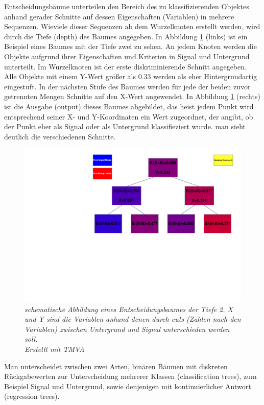 Entscheidungsb\"aume unterteilen den Bereich des zu klassifizierenden Objektes anhand gerader Schnitte auf dessen Eigenschaften (Variablen) in mehrere Sequenzen. Wieviele dieser Sequenzen ab dem Wurzelknoten erstellt werden, wird durch die Tiefe (depth) des Baumes angegeben. In Abbildung \ref{fig:DecicionTree} (links) ist ein Beispiel eines Baumes mit der Tiefe zwei zu sehen. An jedem Knoten werden die Objekte aufgrund ihrer Eigenschaften und Kriterien in Signal und Untergrund unterteilt. Im Wurzelknoten ist der erste diskriminierende Schnitt angegeben. Alle Objekte mit einem Y-Wert gr\"o\ss er als 0.33 werden als eher Hintergrundartig eingestuft. In der n\"achsten Stufe des Baumes werden f\"ur jede der beiden zuvor getrennten Mengen Schnitte auf den X-Wert angewendet. In Abbildung \ref{fig:DecicionTree} (rechts) ist die Ausgabe (output) dieses Baumes abgebildet, das heist jedem Punkt wird entsprechend seiner X- und Y-Koordinaten ein Wert zugeordnet, der angibt, ob der Punkt eher als Signal oder als Untergrund klassifieziert wurde. man sieht deutlich die verschiedenen Schnitte.\\
\begin{figure}[hhh]
 \begin{center}
   \includegraphics[width=\textwidth]{graphics/tree.pdf}
   \parbox[b]{12cm}{
     \caption[Entscheidungsbaumes der Tiefe 2]
             {\label{fig:DecicionTree} \it schematische Abbildung eines Entscheidungsbaumes der Tiefe 2. X und Y sind die Variablen anhand denen durch cuts (Zahlen nach den Variablen) zwischen Untergrund und Signal unterschieden werden soll.\\Erstellt mit TMVA}
   }
 \end{center}
\end{figure}
Man unterscheidet zwischen zwei Arten, bin\"aren B\"aumen mit diskreten R\"uckgabewerten zur Unterscheidung mehrerer Klassen (classification trees), zum Beispiel Signal und Untergrund, sowie denjenigen mit kontinuierlicher Antwort (regression trees). \cite{SWB-455193959}

